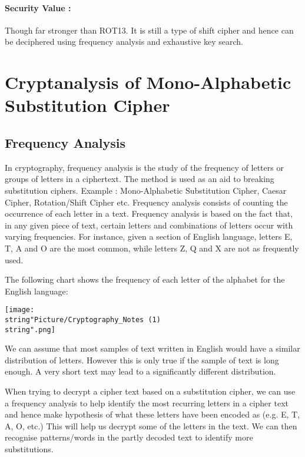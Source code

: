 \documentclass[british]{report}
\begin{document}
\paragraph*{Security Value : }

Though far stronger than ROT13. It is still a type of shift cipher
and hence can be deciphered using frequency analysis and exhaustive
key search.

\vfill{}


\section{Cryptanalysis of Mono-Alphabetic Substitution Cipher}

\subsection{Frequency Analysis}

In cryptography, frequency analysis is the study of the frequency
of letters or groups of letters in a ciphertext. The method is used
as an aid to breaking substitution ciphers. Example : Mono-Alphabetic
Substitution Cipher, Caesar Cipher, Rotation/Shift Cipher etc. Frequency
analysis consists of counting the occurrence of each letter in a text.
Frequency analysis is based on the fact that, in any given piece of
text, certain letters and combinations of letters occur with varying
frequencies. For instance, given a section of English language, letters
E, T, A and O are the most common, while letters Z, Q and X are not
as frequently used.

\medskip{}

\begin{center}
	The following chart shows the frequency of each letter of the alphabet
	for the English language:
	\par\end{center}

\begin{center}
	\texttt{[image: \\string"Picture/Cryptography\_Notes (1)\\string".png]}
	\par\end{center}

\medskip{}

We can assume that most samples of text written in English would have
a similar distribution of letters. However this is only true if the
sample of text is long enough. A very short text may lead to a significantly
different distribution.

When trying to decrypt a cipher text based on a substitution cipher,
we can use a frequency analysis to help identify the most recurring
letters in a cipher text and hence make hypothesis of what these letters
have been encoded as (e.g. E, T, A, O, etc.) This will help us decrypt
some of the letters in the text. We can then recognise patterns/words
in the partly decoded text to identify more substitutions.
\end{document}
